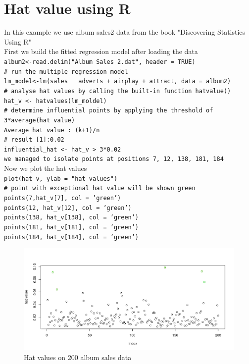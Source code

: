 \documentclass{article}[20pt]
\begin{document}
\section{Hat value using R}
In this example we use album sales2 data from the book "Discovering Statistics Using R" \citep{DSUR} \\
First we build the fitted regression model after loading the data \\
\texttt{album2<-read.delim("Album Sales 2.dat", header = TRUE)\\
\# run the multiple regression model\\
lm\_model<-lm(sales ~ adverts + airplay + attract, data = album2)\\
\# analyse hat values by calling the built-in function hatvalue()\\
hat\_v <- hatvalues(lm\_moldel)\\
\# determine influential points by applying the threshold of 3*average(hat value)\\
Average hat value : (k+1)/n\\
\# result [1]:0.02\\
influential\_hat <- hat\_v > 3*0.02\\
we managed to isolate points at positions 7, 12, 138, 181, 184}\\
Now we plot the hat values \\
\texttt{plot(hat\_v, ylab = "hat values")\\
\# point with exceptional hat value will be shown green\\ 
points(7,hat\_v[7], col = 'green')\\
points(12, hat\_v[12], col = 'green')\\
points(138, hat\_v[138], col = 'green')\\
points(181, hat\_v[181], col = 'green')\\
points(184, hat\_v[184], col = 'green')}

\begin{figure}[h]
\begin{center}
\includegraphics[width=\linewidth]{hat_v}
\end{center}
\caption{Hat values on 200 album sales data}

\label{fig:figure1}
\end{figure}
\end{document}
